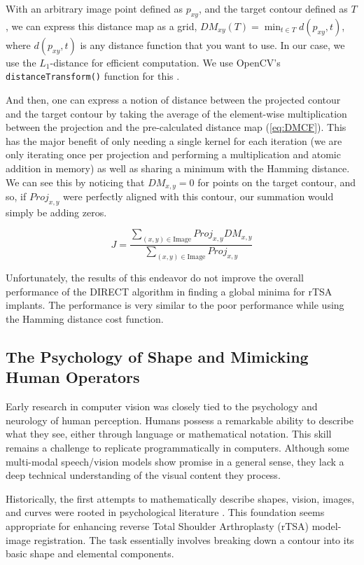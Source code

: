 With an arbitrary image point defined as $p_{xy}$, and the target contour defined as $T$, we can express this distance map as a grid, $\displaystyle DM_{xy}(T) = \min_{t\in T}d(p_{xy},t)$, where $d(p_{xy},t)$ is any distance function that you want to use. In our case, we use the $L_{1}$-distance for efficient computation. We use OpenCV's \texttt{distanceTransform()} function for this \cite{bradskiOpenCVLibrary2000}.

And then, one can express a notion of distance between the projected contour and the target contour by taking the average of the element-wise multiplication between the projection and the pre-calculated distance map (\cref{eq:DMCF}).
This has the major benefit of only needing a single kernel for each iteration (we are only iterating once per projection and performing a multiplication and atomic addition in memory) as well as sharing a minimum with the Hamming distance.
We can see this by noticing that $DM_{x,y}=0$ for points on the target contour, and so, if $Proj_{x,y}$ were perfectly aligned with this contour, our summation would simply be adding zeros.

\begin{equation}
  \label{eq:DMCF}
  J = \dfrac{ \sum_{(x,y) \in \text{Image}} Proj_{x,y}DM_{x,y} }{\sum_{(x,y)\in \text{Image}}Proj_{x,y}}
\end{equation}

Unfortunately, the results of this endeavor do not improve the overall performance of the DIRECT algorithm in finding a global minima for rTSA implants.
The performance is very similar to the poor performance while using the Hamming distance cost function.

\subsection{The Psychology of Shape and Mimicking Human Operators}
Early research in computer vision was closely tied to the psychology and neurology of human perception.
Humans possess a remarkable ability to describe what they see, either through language or mathematical notation.
This skill remains a challenge to replicate programmatically in computers.
Although some multi-modal speech/vision models show promise in a general sense, they lack a deep technical understanding of the visual content they process.

Historically, the first attempts to mathematically describe shapes, vision, images, and curves were rooted in psychological literature \cite{attneaveInformationalAspectsVisual1954,attneaveQuantitativeStudyShape1956,koenderinkStructureImages1984,koenderinkSurfaceShapeCurvature1992}.
This foundation seems appropriate for enhancing reverse Total Shoulder Arthroplasty (rTSA) model-image registration.
The task essentially involves breaking down a contour into its basic shape and elemental components.

